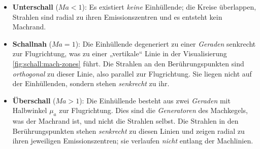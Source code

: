 \begin{itemize}
\item \textbf{Unterschall} ($\textit{Ma}<1$):
Es existiert \emph{keine} Einhüllende; die Kreise überlappen, Strahlen
sind radial zu ihren Emissionszentren und es entsteht kein Machrand.

\item \textbf{Schallnah} ($\textit{Ma}=1$):
Die Einhüllende degeneriert zu einer \emph{Geraden} senkrecht zur Flugrichtung,
was zu einer „vertikale“ Linie in der Visualisierung \ref{fig:schall:mach-zones} führt.
Die Strahlen an den Berührungspunkten sind \emph{orthogonal} zu dieser Linie,
also parallel zur Flugrichtung.
Sie liegen nicht auf der Einhüllenden, sondern stehen \emph{senkrecht} zu ihr.

\item \textbf{Überschall} ($\textit{Ma}>1$):
Die Einhüllende besteht aus zwei \emph{Geraden} mit Halbwinkel $\mu_a$ zur Flugrichtung.
Dies sind die \emph{Generatoren} des Machkegels, was der Machrand ist,
und nicht die Strahlen selbst.
Die Strahlen in den Berührungspunkten stehen \emph{senkrecht} zu
diesen Linien und zeigen radial zu ihren jeweiligen Emissionszentren;
sie verlaufen \emph{nicht} entlang der Machlinien.
\end{itemize}

